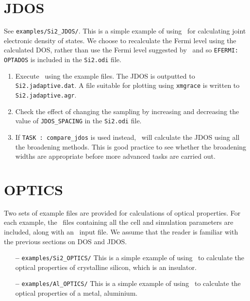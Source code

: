\documentclass[a4paper,11pt,twoside]{book}
\begin{document}
{\section{JDOS}
See  \verb#examples/Si2_JDOS/#. This is a simple example of using \optados\ for calculating joint electronic density of states.  We choose to recalculate the Fermi level using the calculated DOS, rather than use the Fermi level suggested by \castep\, and so \verb#EFERMI: OPTADOS# is included in the \verb#Si2.odi# file.  
\begin{enumerate}
\item Execute \optados\ using the example files.  The JDOS is outputted to {\tt Si2.jadaptive.dat}. A file suitable for plotting using {\tt xmgrace} is written to {\tt Si2.jadaptive.agr}.
\item Check the effect of changing the sampling by increasing and decreasing the value of \verb#JDOS_SPACING# in the \verb#Si2.odi# file. 
\item If {\tt TASK : compare\_jdos} is used instead, \optados\ will calculate the JDOS using all the broadening methods.  This is good practice to see whether the broadening widths are appropriate before more advanced tasks are carried out.  
\end{enumerate}

\section{OPTICS}
Two sets of example files are provided for calculations of optical properties.  For each example, the \castep\ files containing all the cell and simulation parameters are included, along with an \optados\ input file. We assume that the reader is familiar with the previous sections on DOS and JDOS.  
\begin{itemize}
\item[{\bf --}]  \verb#examples/Si2_OPTICS/#  This is a simple example of using \optados\ to calculate the optical properties of crystalline silicon, which is an insulator.   
\item[{\bf --}]\verb#examples/Al_OPTICS/#  This is a simple example of using \optados\ to calculate the optical properties of a metal, aluminium. 
\end{itemize}

}
\end{document}
